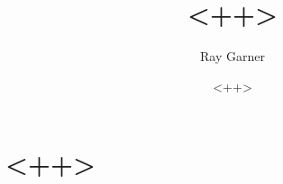 \documentclass{article}
\title{<++>}
\date{<++>}
\author{Ray Garner}
\begin{document}
\maketitle
\thispagestyle{empty}
\tableofcontents
\newpage

\section{<++>}
\paragraph{}

\printbibliography

\paragraph{}

\end{document}
